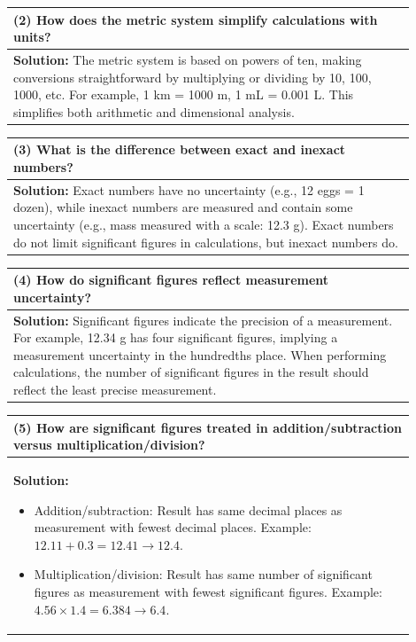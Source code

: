 \documentclass{article}
\begin{document}
\begin{tabular}{|p{0.9\linewidth}|}
\hline
\textbf{(2) How does the metric system simplify calculations with units?} \\ \hline
\textbf{Solution:} The metric system is based on powers of ten, making conversions straightforward by multiplying or dividing by 10, 100, 1000, etc. For example, 1 km = 1000 m, 1 mL = 0.001 L. This simplifies both arithmetic and dimensional analysis. \\ \hline
\end{tabular}
\newpage

\begin{tabular}{|p{0.9\linewidth}|}
\hline
\textbf{(3) What is the difference between exact and inexact numbers?} \\ \hline
\textbf{Solution:} Exact numbers have no uncertainty (e.g., 12 eggs = 1 dozen), while inexact numbers are measured and contain some uncertainty (e.g., mass measured with a scale: 12.3 g). Exact numbers do not limit significant figures in calculations, but inexact numbers do. \\ \hline
\end{tabular}
\newpage

\begin{tabular}{|p{0.9\linewidth}|}
\hline
\textbf{(4) How do significant figures reflect measurement uncertainty?} \\ \hline
\textbf{Solution:} Significant figures indicate the precision of a measurement. For example, 12.34 g has four significant figures, implying a measurement uncertainty in the hundredths place. When performing calculations, the number of significant figures in the result should reflect the least precise measurement. \\ \hline
\end{tabular}
\newpage

\begin{tabular}{|p{0.9\linewidth}|}
\hline
\textbf{(5) How are significant figures treated in addition/subtraction versus multiplication/division?} \\ \hline
\textbf{Solution:} 
\begin{itemize}
    \item Addition/subtraction: Result has same decimal places as measurement with fewest decimal places. Example: $12.11 + 0.3 = 12.41 \to 12.4$.  
    \item Multiplication/division: Result has same number of significant figures as measurement with fewest significant figures. Example: $4.56 \times 1.4 = 6.384 \to 6.4$.  
\end{itemize} \\ \hline
\end{tabular}
\newpage
\end{document}
